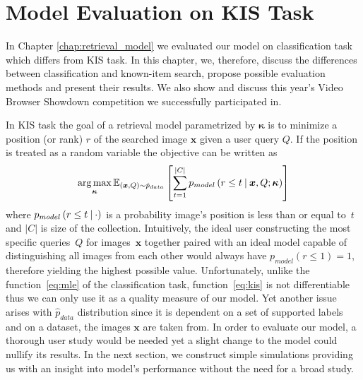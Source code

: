 \chapter{Model Evaluation on KIS Task}\label{chap:evaluation}
In Chapter \ref{chap:retrieval_model} we evaluated our model on classification task which differs from KIS task. In this chapter, we, therefore, discuss the differences between classification and known-item search, propose possible evaluation methods and present their results. We also show and discuss this year's Video Browser Showdown competition we successfully participated in.

In KIS task the goal of a retrieval model parametrized by $\bm{\kappa}$ is to minimize a position (or rank) $r$ of the searched image $\bm{x}$ given a user query $Q$. If the position is treated as a random variable the objective can be written as
\begin{equation}
\mathop{\arg\max}_{\bm{\kappa}}\mathbb{E}_{\left(\bm{x},Q\right)\sim \hat{p}_{data}}\left[
\sum_{t=1}^{|C|}p_{model}\left(r\leq t\:\vert\:\bm{x}, Q;\bm{\kappa}\right)
\right]\label{eq:kis}
\end{equation}
where $p_{model}\left(r\leq t\:\vert\:\cdot\right)$ is a probability image's position is less than or equal to~$t$ and $|C|$ is size of the collection. Intuitively, the ideal user constructing the most specific queries~$Q$ for images~$\bm{x}$ together paired with an ideal model capable of distinguishing all images from each other would always have ${p_{model}\left(r\leq 1\right)=1}$, therefore yielding the highest possible value. Unfortunately, unlike the function~\ref{eq:mle} of the classification task, function~\ref{eq:kis} is not differentiable thus we can only use it as a quality measure of our model. Yet another issue arises with $\hat{p}_{data}$ distribution since it is dependent on a set of supported labels and on a dataset, the images $\bm{x}$ are taken from. In order to evaluate our model, a thorough user study would be needed yet a slight change to the model could nullify its results. In the next section, we construct simple simulations providing us with an insight into model's performance without the need for a broad study.

